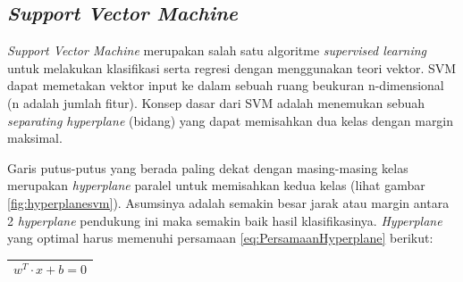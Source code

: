 \subsection{\textit{Support Vector Machine}}
\noindent\textit{Support Vector Machine} merupakan salah satu algoritme \textit{supervised learning} untuk melakukan klasifikasi serta regresi dengan menggunakan teori vektor. SVM dapat memetakan vektor input ke dalam sebuah ruang beukuran n-dimensional (n adalah jumlah fitur). Konsep dasar dari SVM adalah menemukan sebuah \textit{separating hyperplane} (bidang) yang dapat memisahkan dua kelas dengan margin maksimal. 

\noindent Garis putus-putus yang berada paling dekat dengan masing-masing kelas merupakan \textit{hyperplane} paralel untuk memisahkan kedua kelas (lihat gambar \ref{fig:hyperplanesvm}). Asumsinya adalah semakin besar jarak atau margin antara 2 \textit{hyperplane} pendukung ini maka semakin baik hasil klasifikasinya. \textit{Hyperplane} yang optimal harus memenuhi persamaan \ref{eq:PersamaanHyperplane} berikut:

\begin{table}[H]
	\small
	\begin{adjustbox}{width=1\textwidth}
		\begin{tabular}{|p{13.55cm}|}
			\hline
			\begin{equation} 
			w^T \cdot x + b = 0
			\label{eq:PersamaanHyperplane}
			\end{equation}\\
			\hline
		\end{tabular}
	\end{adjustbox}
\end{table}

